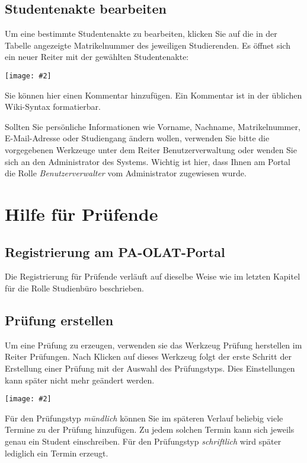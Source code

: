 \documentclass[a4paper,11pt]{article}
\newcommand{\bild}[2]{
    \begin{center}\texttt{[image: \#2]}\end{center}
}
\newcommand{\knopf}[1]{{\sc #1}}
\begin{document}
\subsection{Studentenakte bearbeiten}

Um eine bestimmte Studentenakte zu bearbeiten, klicken Sie auf
die in der Tabelle angezeigte Matrikelnummer des jeweiligen Studierenden.
Es öffnet sich ein neuer Reiter mit der gewählten Studentenakte:

\bild{1}{ESA-Edit}

Sie können hier einen \knopf{Kommentar hinzufügen}. Ein Kommentar ist in der
üblichen Wiki-Syntax formatierbar.

Sollten Sie persönliche Informationen wie Vorname, Nachname,
Matrikelnummer, E-Mail-Adresse oder Studiengang ändern wollen, verwenden Sie
bitte die vorgegebenen Werkzeuge unter dem Reiter \knopf{Benutzerverwaltung}
oder wenden Sie sich an den Administrator des Systems. Wichtig ist hier, dass
Ihnen am Portal die Rolle {\em Benutzerverwalter} vom Administrator zugewiesen wurde.

\clearpage
\section{Hilfe für Prüfende}

\subsection{Registrierung am PA-OLAT-Portal}

Die Registrierung für Prüfende verläuft auf dieselbe Weise wie im letzten
Kapitel für die Rolle Studienbüro beschrieben.

\subsection{Prüfung erstellen}

Um eine Prüfung zu erzeugen, verwenden sie das Werkzeug \knopf{Prüfung
  herstellen} im Reiter \knopf{Prüfungen}. Nach Klicken auf dieses Werkzeug
folgt der erste Schritt der Erstellung einer Prüfung mit der Auswahl des
Prüfungstyps. Dies Einstellungen kann später nicht mehr geändert werden.

\bild{1}{Pruefung-Erzeugen-Typ}

Für den Prüfungstyp {\em mündlich} können Sie im späteren Verlauf beliebig
viele Termine zu der Prüfung hinzufügen. Zu jedem solchen Termin kann sich
jeweils genau ein Student einschreiben.  Für den Prüfungstyp {\em schriftlich}
wird später lediglich ein Termin erzeugt.
\end{document}
